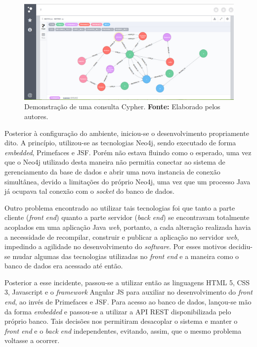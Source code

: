 \begin{figure}[h!]
	\centerline{\includegraphics[scale=0.4]{./imagens/neo4j2.jpg}}
	\caption[Demonstração de uma consulta Cypher.]
	{Demonstração de uma consulta Cypher. \textbf{Fonte:} Elaborado pelos autores.}
	\label{fig:exemplo1}
\end{figure}
 
\newpage

\par Posterior à configuração do ambiente, iniciou-se o desenvolvimento propriamente dito. A princípio, utilizou-se as tecnologias Neo4j, sendo executado de forma \textit{embedded}, Primefaces e JSF. Porém não estava fluindo como o esperado, uma vez que o Neo4j utilizado desta maneira não permitia conectar ao sistema de gerenciamento da base de dados e abrir uma nova instancia de conexão simultânea, devido a limitações do próprio Neo4j, uma vez que um processo Java já ocupava tal conexão com o \textit{socket} do banco de dados.

\par Outro problema encontrado ao utilizar tais tecnologias foi que tanto a parte cliente (\textit{front end}) quanto a parte servidor (\textit{back end}) se encontravam totalmente acoplados em uma aplicação Java \textit{web}, portanto, a cada alteração realizada havia a necessidade de recompilar, construir e publicar a aplicação no servidor \textit{web}, impedindo a agilidade no desenvolvimento do \textit{software}. Por esses motivos decidiu-se mudar algumas das tecnologias utilizadas no \textit{front end} e a maneira como o banco de dados era acessado até então. 

\par Posterior a esse incidente, passou-se a utilizar então as linguagens HTML 5, CSS 3, Javascript e o \textit{framework} Angular JS para auxiliar no desenvolvimento do \textit{front end}, ao invés de Primefaces e JSF. Para acesso ao banco de dados, lançou-se mão da forma \textit{embedded} e passou-se a utilizar a API REST disponibilizada pelo próprio banco. Tais decisões nos permitiram desacoplar o sistema e manter o \textit{front end} e o \textit{back end} independentes, evitando, assim, que o mesmo problema voltasse a ocorrer.

